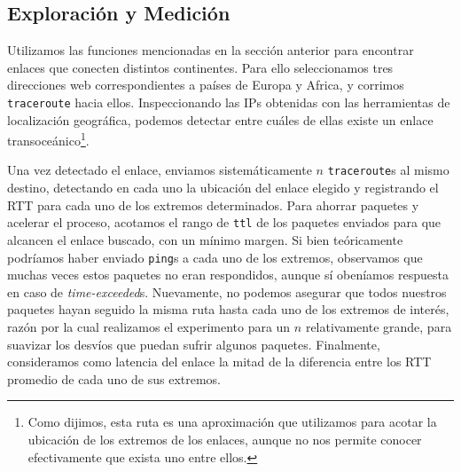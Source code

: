  
 \subsection{Exploraci\'on y Medición}
 
 Utilizamos las funciones mencionadas en la secci\'on anterior para encontrar enlaces que conecten distintos continentes. Para ello seleccionamos tres direcciones web correspondientes a pa\'ises de Europa y Africa, y corrimos \texttt{traceroute} hacia ellos. Inspeccionando las IPs obtenidas con las herramientas de localización geográfica, podemos detectar entre cuáles de ellas existe un enlace transoceánico\footnote{Como dijimos, esta ruta es una aproximación que utilizamos para acotar la ubicación de los extremos de los enlaces, aunque no nos permite conocer efectivamente que exista uno entre ellos.}. %
 
 Una vez detectado el enlace, enviamos sistemáticamente $n$ \texttt{traceroute}s al mismo destino, detectando en cada uno la ubicación del enlace elegido y registrando el RTT para cada uno de los extremos determinados. Para ahorrar paquetes y acelerar el proceso, acotamos el rango de \texttt{ttl} de los paquetes enviados para que alcancen el enlace buscado, con un mínimo margen. Si bien teóricamente podríamos haber enviado \texttt{ping}s a cada uno de los extremos, observamos que muchas veces estos paquetes no eran respondidos, aunque sí obeníamos respuesta en caso de \emph{time-exceeded}s. Nuevamente, no podemos asegurar que todos nuestros paquetes hayan seguido la misma ruta hasta cada uno de los extremos de interés, razón por la cual realizamos el experimento para un $n$ relativamente grande, para suavizar los desvíos que puedan sufrir algunos paquetes. Finalmente, consideramos como latencia del enlace la mitad de la diferencia entre los RTT promedio de cada uno de sus extremos.
